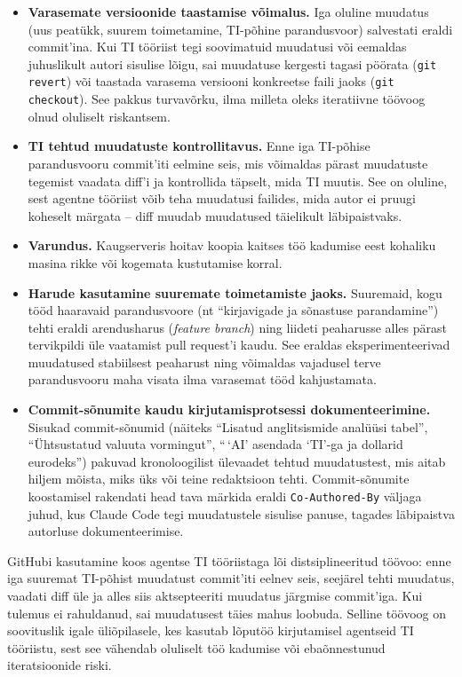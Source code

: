 \begin{itemize}
    \item \textbf{Varasemate versioonide taastamise võimalus.} Iga oluline muudatus (uus peatükk, suurem toimetamine, TI-põhine parandusvoor) salvestati eraldi commit'ina. Kui TI tööriist tegi soovimatuid muudatusi või eemaldas juhuslikult autori sisulise lõigu, sai muudatuse kergesti tagasi pöörata (\texttt{git revert}) või taastada varasema versiooni konkreetse faili jaoks (\texttt{git checkout}). See pakkus turvavõrku, ilma milleta oleks iteratiivne töövoog olnud oluliselt riskantsem.
    \item \textbf{TI tehtud muudatuste kontrollitavus.} Enne iga TI-põhise parandusvooru commit'iti eelmine seis, mis võimaldas pärast muudatuste tegemist vaadata diff'i ja kontrollida täpselt, mida TI muutis. See on oluline, sest agentne tööriist võib teha muudatusi failides, mida autor ei pruugi koheselt märgata -- diff muudab muudatused täielikult läbipaistvaks.
    \item \textbf{Varundus.} Kaugserveris hoitav koopia kaitses töö kadumise eest kohaliku masina rikke või kogemata kustutamise korral.
    \item \textbf{Harude kasutamine suuremate toimetamiste jaoks.} Suuremaid, kogu tööd haaravaid parandusvoore (nt ``kirjavigade ja sõnastuse parandamine'') tehti eraldi arendusharus (\textit{feature branch}) ning liideti peaharusse alles pärast tervikpildi üle vaatamist pull request'i kaudu. See eraldas eksperimenteerivad muudatused stabiilsest peaharust ning võimaldas vajadusel terve parandusvooru maha visata ilma varasemat tööd kahjustamata.
    \item \textbf{Commit-sõnumite kaudu kirjutamisprotsessi dokumenteerimine.} Sisukad commit-sõnumid (näiteks ``Lisatud anglitsismide analüüsi tabel'', ``Ühtsustatud valuuta vormingut'', ``\,`AI' asendada `TI'-ga ja dollarid eurodeks'') pakuvad kronoloogilist ülevaadet tehtud muudatustest, mis aitab hiljem mõista, miks üks või teine redaktsioon tehti. Commit-sõnumite koostamisel rakendati head tava märkida eraldi \texttt{Co-Authored-By} väljaga juhud, kus Claude Code tegi muudatustele sisulise panuse, tagades läbipaistva autorluse dokumenteerimise.
\end{itemize}

GitHubi kasutamine koos agentse TI tööriistaga lõi distsiplineeritud töövoo: enne iga suuremat TI-põhist muudatust commit'iti eelnev seis, seejärel tehti muudatus, vaadati diff üle ja alles siis aktsepteeriti muudatus järgmise commit'iga. Kui tulemus ei rahuldanud, sai muudatusest täies mahus loobuda. Selline töövoog on soovituslik igale üliõpilasele, kes kasutab lõputöö kirjutamisel agentseid TI tööriistu, sest see vähendab oluliselt töö kadumise või ebaõnnestunud iteratsioonide riski.

